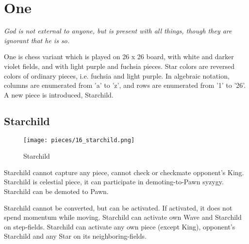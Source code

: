 

\chapter*{One}

\begin{flushright}
\parbox{0.8\textwidth}{
\emph{God is not external to anyone, but is present with all things, though
they are ignorant that he is so. \\
 } }
\end{flushright}

\noindent
One is chess variant which is played on 26 x 26 board, with white and
darker violet fields, and with light purple and fuchsia pieces. Star
colors are reversed colors of ordinary pieces, i.e. fuchsia and light
purple. In algebraic notation, columns are enumerated from 'a' to 'z',
and rows are enumerated from '1' to '26'. A new piece is introduced,
Starchild.

\clearpage %

\section*{Starchild}

\noindent
\begin{wrapfigure}[11]{l}{0.4\textwidth}
\centering
\texttt{[image: pieces/16\_starchild.png]}
\caption{Starchild}
\label{fig:16_starchild}
\end{wrapfigure}
Starchild cannot capture any piece, cannot check or checkmate opponent's King.
Starchild is celestial piece, it can participate in demoting-to-Pawn syzygy.
Starchild can be demoted to Pawn.

Starchild cannot be converted, but can be activated. If activated, it does not spend
momentum while moving. Starchild can activate own Wave and Starchild on step-fields.
Starchild can activate any own piece (except King), opponent's Starchild and any Star
on its neighboring-fields.

